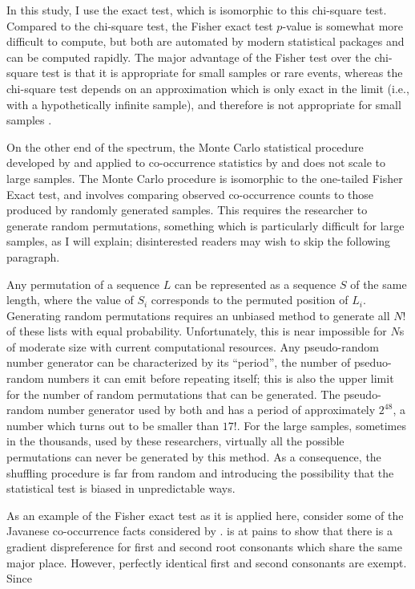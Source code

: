 In this study, I use the \citet{Fisher1934} exact test, which is isomorphic to this chi-square test. Compared to the chi-square test, the Fisher exact test $p$-value is somewhat more difficult to compute, but both are automated by modern statistical packages and can be computed rapidly. The major advantage of the Fisher test over the chi-square test is that it is appropriate for small samples or rare events, whereas the chi-square test depends on an approximation which is only exact in the limit (i.e., with a hypothetically infinite sample), and therefore is not appropriate for small samples \citep[see][]{Gorman2012a}.

On the other end of the spectrum, the Monte Carlo statistical procedure developed by \citet{Kessler2001} and applied to co-occurrence statistics by \citet{Martin2007,Martin2011} and \citet{Brown2010} does not scale to large samples. The Monte Carlo procedure is isomorphic to the one-tailed Fisher Exact test, and involves comparing observed co-occurrence counts to those produced by randomly generated samples.  This requires the researcher to generate random permutations, something which is particularly difficult for large samples, as I will explain; disinterested readers may wish to skip the following paragraph.

Any permutation of a sequence $L$ can be represented as a sequence $S$ of the same length, where the value of $S_i$ corresponds to the permuted position of $L_i$. Generating random permutations requires an unbiased method to generate all $N!$ of these lists with equal probability. Unfortunately, this is near impossible for $N$s of moderate size with current computational resources. Any pseudo-random number generator can be characterized by its ``period'', the number of pseduo-random numbers it can emit before repeating itself; this is also the upper limit for the number of random permutations that can be generated. The pseudo-random number generator used by both \citeauthor{Martin2011} and \citeauthor{Brown2010} has a period of approximately $2^{48}$, a number which turns out to be smaller than $17!$. For the large samples, sometimes in the thousands, used by these researchers, virtually all the possible permutations can never be generated by this method. As a consequence, the shuffling procedure is far from random and introducing the possibility that the statistical test is biased in unpredictable ways.

As an example of the Fisher exact test as it is applied here, consider some of the Javanese co-occurrence facts considered by \citet{Mester1988}. \citeauthor{Mester1988} is at pains to show that there is a gradient dispreference for first and second root consonants which share the same major place. However, perfectly identical first and second consonants are exempt. Since 


